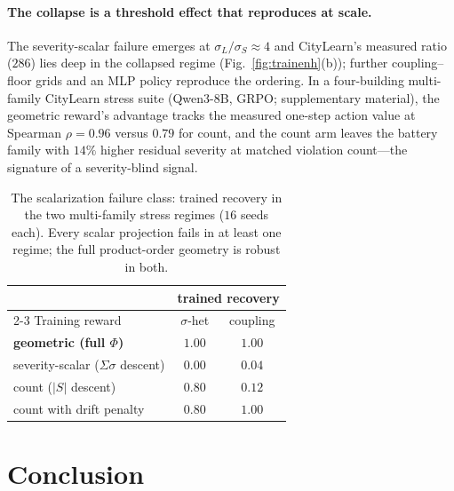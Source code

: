 \documentclass[letterpaper]{article} %
\theoremstyle{plain}
\begin{document}
\paragraph{The collapse is a threshold effect that reproduces at scale.}
The severity-scalar failure emerges at $\sigma_L/\sigma_S\!\approx\!4$ and CityLearn's measured ratio ($286$) lies deep in the collapsed regime (Fig.~\ref{fig:trainenh}(b)); further coupling--floor grids and an MLP policy reproduce the ordering. In a four-building multi-family CityLearn stress suite (Qwen3-8B, GRPO; supplementary material), the geometric reward's advantage tracks the measured one-step action value at Spearman $\rho{=}0.96$ versus $0.79$ for count, and the count arm leaves the battery family with $14\%$ higher residual severity at matched violation count---the signature of a severity-blind signal.

\begin{table}[t]
\centering
\caption{The scalarization failure class: trained recovery in the two multi-family stress regimes ($16$ seeds each). Every scalar projection fails in at least one regime; the full product-order geometry is robust in both.}
\label{tab:failureclass}
\footnotesize
\begin{tabular*}{\columnwidth}{@{\extracolsep{\fill}}lcc@{}}
\toprule
 & \multicolumn{2}{c}{trained recovery} \\
\cmidrule(lr){2-3}
Training reward & $\sigma$-het & coupling \\
\midrule
\textbf{geometric (full $\Phi$)} & $\mathbf{1.00}$ & $\mathbf{1.00}$ \\
severity-scalar ($\Sigma\sigma$ descent) & $0.00$ & $0.04$ \\
count ($|S|$ descent) & $0.80$ & $0.12$ \\
count with drift penalty & $0.80$ & $1.00$ \\
\bottomrule
\end{tabular*}
\end{table}

\section{Conclusion}
\label{sec:conclusion}
\end{document}
